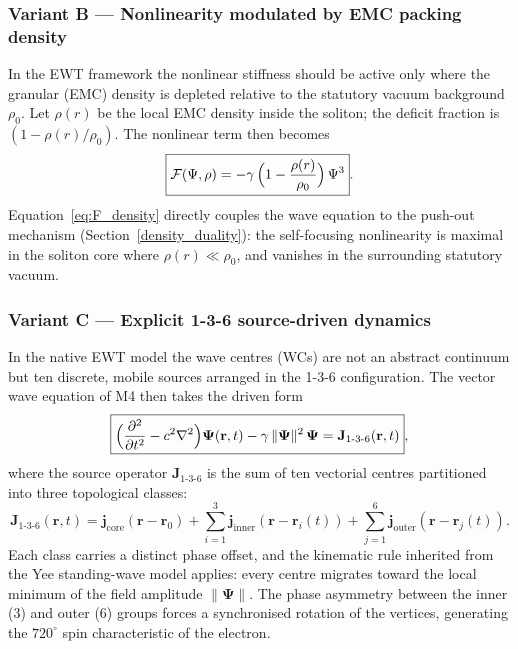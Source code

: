\documentclass[10pt,a4paper]{article}
\begin{document}
\subsubsection*{Variant B --- Nonlinearity modulated by EMC packing density}
In the EWT framework the nonlinear stiffness should be active only where the
granular (EMC) density is depleted relative to the statutory vacuum background
$\rho_{0}$. Let $\rho(r)$ be the local EMC density inside the soliton;
the deficit fraction is $(1-\rho(r)/\rho_{0})$. The nonlinear term then becomes
\begin{equation}\label{eq:F_density}
	\boxed{\mathcal{F}(\Psi,\rho)
		= -\gamma\,\Bigl(1-\frac{\rho(r)}{\rho_{0}}\Bigr)\,\Psi^{3}} .
\end{equation}
Equation~\eqref{eq:F_density} directly couples the wave equation to the
push-out mechanism (Section~\ref{density_duality}): the self-focusing
nonlinearity is maximal in the soliton core where $\rho(r) \ll \rho_{0}$,
and vanishes in the surrounding statutory vacuum.

\subsubsection*{Variant C --- Explicit 1-3-6 source-driven dynamics}
In the native EWT model the wave centres (WCs) are not an abstract continuum
but ten discrete, mobile sources arranged in the 1-3-6 configuration.
The vector wave equation of M4 then takes the driven form
\begin{equation}\label{eq:F_source}
	\boxed{\Bigl( \frac{\partial^{2}}{\partial t^{2}} - c^{2}\nabla^{2} \Bigr)
		\mathbf{\Psi}(\mathbf{r},t) - \gamma\,\|\mathbf{\Psi}\|^{2}\,\mathbf{\Psi}
		= \mathbf{J}_{1\text{-}3\text{-}6}(\mathbf{r},t)} ,
\end{equation}
where the source operator $\mathbf{J}_{1\text{-}3\text{-}6}$ is the sum of ten
vectorial centres partitioned into three topological classes:
\begin{equation}\label{eq:J_operator}
	\mathbf{J}_{1\text{-}3\text{-}6}(\mathbf{r},t) =
	\mathbf{j}_{\text{core}}(\mathbf{r} - \mathbf{r}_{0})
	+ \sum_{i=1}^{3} \mathbf{j}_{\text{inner}}(\mathbf{r} - \mathbf{r}_{i}(t))
	+ \sum_{j=1}^{6} \mathbf{j}_{\text{outer}}(\mathbf{r} - \mathbf{r}_{j}(t)) .
\end{equation}
Each class carries a distinct phase offset, and the kinematic rule inherited
from the Yee standing-wave model applies: every centre migrates toward the
local minimum of the field amplitude $\|\mathbf{\Psi}\|$.  The phase asymmetry
between the inner (3) and outer (6) groups forces a synchronised rotation of
the vertices, generating the $720^{\circ}$ spin characteristic of the electron.
\end{document}
